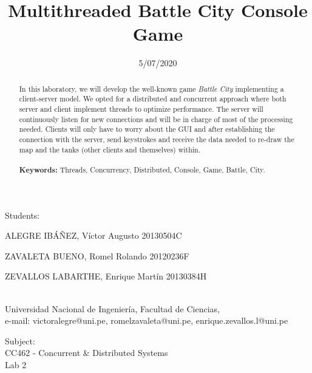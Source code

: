 \documentclass[10pt,a4paper]{article}
\theoremstyle{definition}
\begin{document}
	
\title{Multithreaded Battle City Console Game}
\date{5/07/2020}
\maketitle

\begin{center}
	Students:\\
	\vspace{5pt}
	{\large ALEGRE IB\'A\~NEZ, V\'ictor Augusto 20130504C

ZAVALETA BUENO, Romel Rolando 20120236F

ZEVALLOS LABARTHE, Enrique Mart\'in 20130384H}\\
	Universidad Nacional de Ingenier\'ia, Facultad de Ciencias,\\
	e-mail: victoralegre@uni.pe, romelzavaleta@uni.pe, enrique.zevallos.l@uni.pe
	
\end{center}
\vspace{5pt}
\begin{center}
	Subject:\\
	\vspace{5pt}
	{\large CC462 - Concurrent \& Distributed Systems
}\\
	{\large Lab 2}\\
	

	
\end{center}
\vspace{20pt}
\begin{abstract}
{\small
\hspace*{0.5cm}
	In this laboratory, we will develop the well-known game \textit{Battle City} implementing a client-server model. We opted for a distributed and concurrent approach where both server and client implement threads to optimize performance. The server will continuously listen for new connections and will be in charge of most of the processing needed. Clients will only have to worry about the GUI and after establishing the connection with the server, send keystrokes and receive the data needed to re-draw the map and the tanks (other clients and themselves) within.\\\\
\textbf{Keywords:} Threads, Concurrency, Distributed, Console, Game, Battle, City.
}
\end{abstract}




\tableofcontents
\end{document}

